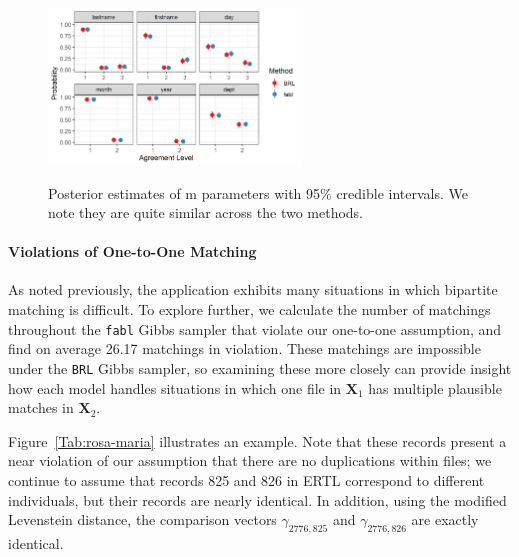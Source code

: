 \documentclass[12pt,letterpaper]{article}
\newcommand{\1}[1]{\mathbb{I}\!\left[#1\right]} %
\begin{document}
\begin{figure}[h!]
\begin{center}
\includegraphics[width=0.6\textwidth]{../notes/figures/el_salvador/m_posterior_smallP} 
\caption{Posterior estimates of m parameters with 95\% credible intervals. We note they are quite similar across the two methods. }\label{fig:m-and-u}
\label{fig:m-and-u}
\end{center}
\end{figure}



\paragraph{Violations of One-to-One Matching} 

As noted previously, the application exhibits many situations in which bipartite matching is difficult. To explore further, we calculate the number of matchings throughout the \texttt{fabl} Gibbs sampler that violate our one-to-one assumption, and find on average 26.17 matchings in violation. These matchings are impossible under the \texttt{BRL} Gibbs sampler, so examining these more closely can provide insight how each model handles situations in which one file in \(\bm{X}_1\) has
multiple plausible matches in \(\bm{X}_2\). 


Figure~\ref{Tab:rosa-maria} illustrates an example. Note that these
records present a near violation of our assumption that there are no
duplications within files; we continue to assume that records 825 and
826 in ERTL correspond to different individuals, but their records are
nearly identical. In addition, using the modified Levenstein distance, the comparison vectors \(\gamma_{2776, 825}\) and
\(\gamma_{2776, 826}\) are exactly identical.
\end{document}
